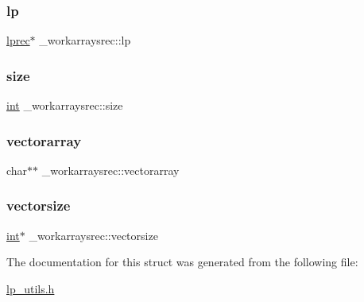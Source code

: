 \subsubsection{\texorpdfstring{lp}{lp}}
{\footnotesize\ttfamily \hyperlink{lp__types_8h_afe42f1373b9ee8d824b5cad6a22d24c6}{lprec}$\ast$ \+\_\+workarraysrec\+::lp}

\mbox{\label{struct__workarraysrec_a0f980d0e3ae4b2f65ae77a59596fa381}} 
\subsubsection{\texorpdfstring{size}{size}}
{\footnotesize\ttfamily \hyperlink{lp__lib_8h_adeb9ec6400320e4923ac9d836d509ddb}{int} \+\_\+workarraysrec\+::size}

\mbox{\label{struct__workarraysrec_a5b2622e9a76d58140250ac939bf96810}} 
\subsubsection{\texorpdfstring{vectorarray}{vectorarray}}
{\footnotesize\ttfamily char$\ast$$\ast$ \+\_\+workarraysrec\+::vectorarray}

\mbox{\label{struct__workarraysrec_a20cbb8418fac1fe18a9725ba186e88e3}} 
\subsubsection{\texorpdfstring{vectorsize}{vectorsize}}
{\footnotesize\ttfamily \hyperlink{lp__lib_8h_adeb9ec6400320e4923ac9d836d509ddb}{int}$\ast$ \+\_\+workarraysrec\+::vectorsize}



The documentation for this struct was generated from the following file\+:\begin{DoxyCompactItemize}
\item 
\hyperlink{lp__utils_8h}{lp\+\_\+utils.\+h}\end{DoxyCompactItemize}
